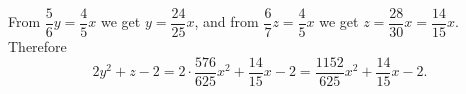 From $\dfrac{5}{6}y=\dfrac{4}{5}x$ we get $y=\dfrac{24}{25}x$, and from $\dfrac{6}{7}z=\dfrac{4}{5}x$ we get $z=\dfrac{28}{30}x=\dfrac{14}{15}x$. Therefore
\[
2y^2+z-2=2\cdot\dfrac{576}{625}x^2+\dfrac{14}{15}x-2=\boxed{\dfrac{1152}{625}x^2+\dfrac{14}{15}x-2}.
\]
